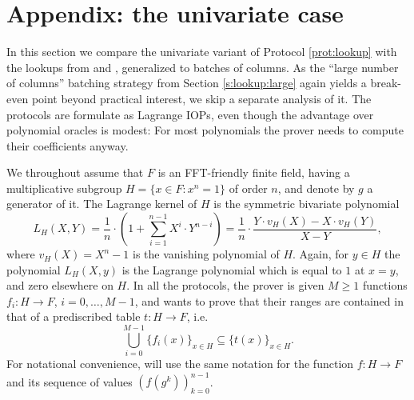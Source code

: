 \appendix
\section{Appendix: the univariate case}
\label{s:appendix}

In this section we compare the univariate variant of Protocol \ref{prot:lookup} with the lookups from \cite{Plookup} and \cite{flookup}, generalized to batches of columns.
As the ``large number of columns'' batching strategy from Section \ref{s:lookup:large}  again yields a break-even point beyond practical interest\footnotemark, we skip a separate analysis of it.
%
The protocols are formulate as Lagrange IOPs, even though the advantage over  polynomial oracles is modest:
For most polynomials the prover needs to compute their coefficients anyway.

We throughout assume that $F$ is an FFT-friendly finite field, having a multiplicative subgroup $H = \{x\in F: x^n = 1\}$ of order $n$, and denote by $g$ a generator of it.  
The Lagrange kernel of $H$ is the symmetric bivariate polynomial
\[
L_H(X, Y) =\frac{1}{n}\cdot\left(1 + \sum_{i=1}^{n-1} X^i\cdot Y^{n-i}\right) = \frac{1}{n}\cdot \frac{Y\cdot v_H(X) - X\cdot v_H(Y)}{X - Y},
\]
where $v_H(X)= X^n - 1$ is the vanishing polynomial of $H$.
Again, for $y\in H$ the polynomial $L_H(X, y)$ is the Lagrange polynomial which is equal to $1$ at  $x=y$, and zero elsewhere on $H$.
In all the protocols, the prover is given $M\geq 1$ functions $f_i:H\rightarrow F$, $i=0, \ldots, M-1$, and wants to prove that their ranges are contained in that of a prediscribed table $t: H\rightarrow F$, i.e. 
\[
\bigcup_{i=0}^{M-1} \{f_i(x)\}_{x\in H}\subseteq \{t(x)\}_{x\in H}.
\]
For notational convenience, will use the same notation for the function $f: H\rightarrow F$ and its sequence of values $(f(g^k))_{k=0}^{n-1}$. 

